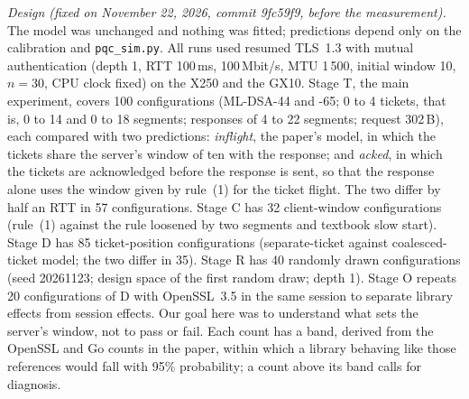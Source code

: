\documentclass[9pt]{article}
\begin{document}
\emph{Design (fixed on November 22, 2026, commit 9fc59f9, before the measurement).} The model was unchanged and nothing was fitted; predictions depend only on the calibration and \texttt{pqc\_sim.py}. All runs used resumed TLS~1.3 with mutual authentication (depth 1, RTT 100\,ms, 100\,Mbit/s, MTU 1\,500, initial window 10, $n=30$, CPU clock fixed) on the X250 and the GX10. Stage T, the main experiment, covers 100 configurations (ML-DSA-44 and -65; 0 to 4 tickets, that is, 0 to 14 and 0 to 18 segments; responses of 4 to 22 segments; request 302\,B), each compared with two predictions: \emph{inflight}, the paper's model, in which the tickets share the server's window of ten with the response; and \emph{acked}, in which the tickets are acknowledged before the response is sent, so that the response alone uses the window given by rule~(1) for the ticket flight. The two differ by half an RTT in 57 configurations. Stage C has 32 client-window configurations (rule~(1) against the rule loosened by two segments and textbook slow start). Stage D has 85 ticket-position configurations (separate-ticket against coalesced-ticket model; the two differ in 35). Stage R has 40 randomly drawn configurations (seed 20261123; design space of the first random draw; depth 1). Stage O repeats 20 configurations of D with OpenSSL~3.5 in the same session to separate library effects from session effects. Our goal here was to understand what sets the server's window, not to pass or fail. Each count has a band, derived from the OpenSSL and Go counts in the paper, within which a library behaving like those references would fall with 95\% probability; a count above its band calls for diagnosis.
\end{document}
